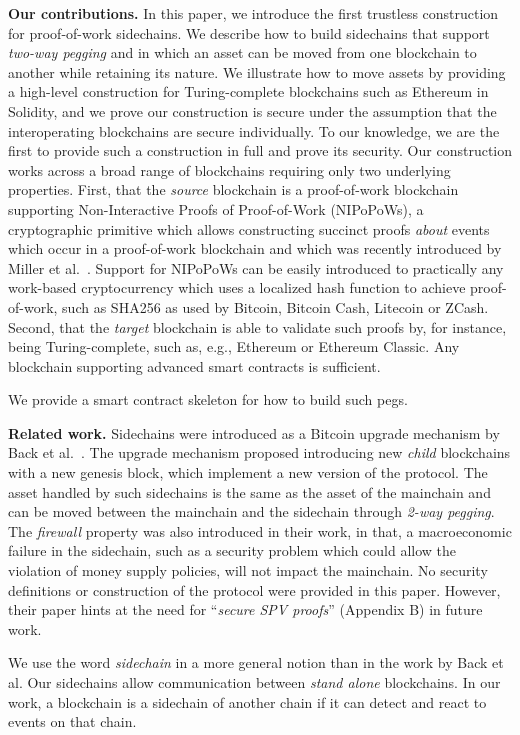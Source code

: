 \noindent\textbf{Our contributions. } In this paper, we introduce the first
trustless construction for proof-of-work sidechains. We describe how to build
sidechains that support \emph{two-way pegging} and in which an asset can be
moved from one blockchain to another while retaining its nature. We illustrate
how to move assets by providing a high-level construction for Turing-complete
blockchains such as Ethereum in Solidity, and we prove our construction is
secure under the assumption that the interoperating blockchains are secure
individually. To our knowledge, we are the first to provide such a construction
in full and prove its security. Our construction works across a broad range of
blockchains requiring only two underlying properties. First, that the
\emph{source} blockchain is a proof-of-work blockchain supporting
Non-Interactive Proofs of Proof-of-Work (NIPoPoWs), a cryptographic primitive
which allows constructing succinct proofs \emph{about} events which occur in a
proof-of-work blockchain and which was recently introduced by Miller et
al.~\cite{nipopows}. Support for NIPoPoWs can be easily introduced to practically
any work-based cryptocurrency which uses a localized hash function to achieve
proof-of-work, such as SHA256 as used by Bitcoin, Bitcoin Cash, Litecoin or
ZCash. Second, that the \emph{target} blockchain is able to validate such proofs
by, for instance, being Turing-complete, such as, e.g., Ethereum or Ethereum
Classic. Any blockchain supporting advanced smart contracts is sufficient.

We provide a smart contract skeleton for how to build such pegs.

\noindent\textbf{Related work. }
Sidechains were introduced as a Bitcoin upgrade mechanism by Back et
al.~\cite{sidechains}. The upgrade mechanism proposed introducing new
\emph{child} blockchains with a new genesis block, which implement a new version
of the protocol. The asset handled by such sidechains is the same as the asset
of the mainchain and can be moved between the mainchain and the sidechain
through \emph{2-way pegging}. The \emph{firewall} property was also introduced
in their work, in that, a macroeconomic failure in the sidechain, such as a
security problem which could allow the violation of money supply policies, will
not impact the mainchain. No security definitions or construction of the
protocol were provided in this paper. However, their paper hints at the need for
``\emph{secure SPV proofs}'' (Appendix B) in future work.

We use the word \emph{sidechain} in a more general notion than in the work by
Back et al. Our sidechains allow communication between \emph{stand
alone} blockchains. In our work, a blockchain is a sidechain of another chain if
it can detect and react to events on that chain.

